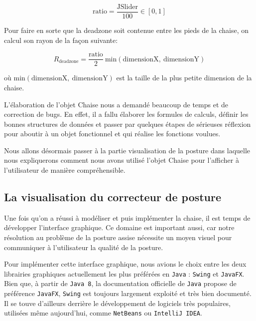 \documentclass{polytech/polytech}
\begin{document}
$$\mathrm{ratio} = \frac{\mathrm{JSlider}}{100} \in [0, 1]$$

Pour faire en sorte que la deadzone soit contenue entre les pieds de la chaise, on calcul son rayon de la façon suivante:

$$R_\mathrm{deadzone} = \frac{\mathrm{ratio}}{2}\ \mathrm{min}(\mathrm{dimensionX},\ \mathrm{dimensionY})$$

où $\mathrm{min}(\mathrm{dimensionX},\ \mathrm{dimensionY})$ est la taille de la plus petite dimension de la chaise.

L'élaboration de l'objet Chaise nous a demandé beaucoup de temps et de correction de bugs. En effet, il a fallu élaborer les formules de calculs, définir les bonnes structures de données et passer par quelques étapes de sérieuses réflexion pour aboutir à un objet fonctionnel et qui réalise les fonctions voulues.

Nous allons désormais passer à la partie visualisation de la posture dans laquelle nous expliquerons comment nous avons utilisé l'objet Chaise pour l'afficher à l'utilisateur de manière compréhensible.


\subsection{La visualisation du correcteur de posture}
\label{subsec:visualisation}

Une fois qu'on a réussi à modéliser et puis implémenter la chaise, il est temps de développer l'interface graphique. Ce domaine est important aussi, car notre résolution au problème de la posture assise nécessite un moyen visuel pour communiquer à l'utilisateur la qualité de la posture.

Pour implémenter cette interface graphique, nous avions le choix entre les deux librairies graphiques actuellement les plus préférées en \texttt{Java} : \texttt{Swing} et \texttt{JavaFX}. Bien que, à partir de \texttt{Java 8}, la documentation officielle de \texttt{Java} propose de préférence \texttt{JavaFX}, \texttt{Swing} est toujours largement exploité et très bien documenté. Il se touve d’ailleurs derrière le développement de logiciels très populaires, utilisées même aujourd'hui, comme \texttt{NetBeans} ou \texttt{IntelliJ IDEA}.
\end{document}
